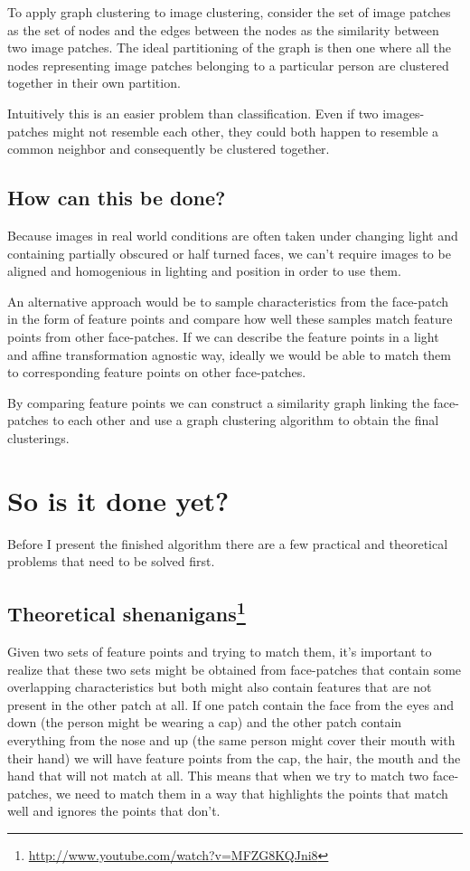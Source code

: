 \documentclass{article}
\begin{document}
To apply graph clustering to image clustering, consider the set of image 
patches as the set of nodes and the edges between the nodes as the similarity 
between two image patches. The ideal partitioning of the graph is then one 
where all the nodes representing image patches belonging to a particular person 
are clustered together in their own partition.

Intuitively this is an easier problem than classification. Even if two 
images-patches might not resemble each other, they could both happen to 
resemble a common neighbor and consequently be clustered together.

\subsection{How can this be done?}
Because images in real world conditions are often taken under changing light 
and containing partially obscured or half turned faces, we can't require images 
to be aligned and homogenious in lighting and position in order to use them.  

An alternative approach would be to sample characteristics from the face-patch 
in the form of feature points and compare how well these samples match feature 
points from other face-patches. If we can describe the feature points in a 
light and affine transformation agnostic way, ideally we would be able to match 
them to corresponding feature points on other face-patches.

By comparing feature points we can construct a similarity graph linking the 
face-patches to each other and use a graph clustering algorithm to obtain the 
final clusterings.

\section{So is it done yet?}
Before I present the finished algorithm there are a few practical and 
theoretical problems that need to be solved first.

\subsection{Theoretical shenanigans\footnote{%
\href{http://www.youtube.com/watch?v=MFZG8KQJni8}{http://www.youtube.com/watch?v=MFZG8KQJni8}}}

Given two sets of feature points and trying to match them, it's important to 
realize that these two sets might be obtained from face-patches that contain 
some overlapping characteristics but both might also contain features that are 
not present in the other patch at all. If one patch contain the face from the 
eyes and down (the person might be wearing a cap) and the other patch contain 
everything from the nose and up (the same person might cover their mouth with 
their hand) we will have feature points from the cap, the hair, the mouth and 
the hand that will not match at all. This means that when we try to match two 
face-patches, we need to match them in a way that highlights the points that 
match well and ignores the points that don't.
\end{document}
